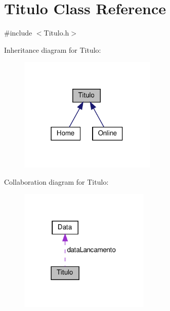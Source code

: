 \hypertarget{classTitulo}{}\section{Titulo Class Reference}
\label{classTitulo}


{\ttfamily \#include $<$Titulo.\+h$>$}



Inheritance diagram for Titulo\+:
\nopagebreak
\begin{figure}[H]
\begin{center}
\leavevmode
\includegraphics[width=186pt]{classTitulo__inherit__graph}
\end{center}
\end{figure}


Collaboration diagram for Titulo\+:
\nopagebreak
\begin{figure}[H]
\begin{center}
\leavevmode
\includegraphics[width=177pt]{classTitulo__coll__graph}
\end{center}
\end{figure}
